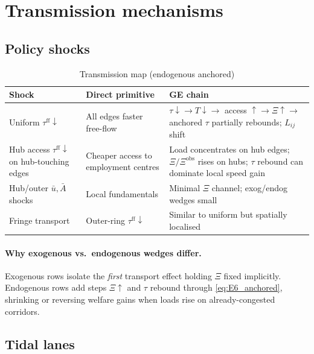 \documentclass[12pt]{article}
\newcommand{\ubar}{\bar u}
\newcommand{\Abar}{\bar A}
\newcommand{\obs}{\mathrm{obs}}
\newcommand{\ff}{\mathrm{ff}}
\begin{document}
\section{Transmission mechanisms}\label{sec:transmission}

\subsection{Policy shocks}

\begin{table}[htbp]
  \centering
  \caption{Transmission map (endogenous anchored)}
  \small
  \begin{tabular}{p{3.2cm}p{4.2cm}p{5.5cm}}
  \toprule
  Shock & Direct primitive & GE chain \\
  \midrule
  Uniform $\tau^{\ff}\downarrow$ &
    All edges faster free-flow &
    $\tau\downarrow\to T\downarrow\to$ access $\uparrow\to\Xi\uparrow\to$
    anchored $\tau$ partially rebounds; $L_{ij}$ shift \\
  Hub access $\tau^{\ff}\downarrow$ on hub-touching edges &
    Cheaper access to employment centres &
    Load concentrates on hub edges; $\Xi/\Xi^{\obs}$ rises on hubs;
    $\tau$ rebound can dominate local speed gain \\
  Hub/outer $\ubar,\Abar$ shocks &
    Local fundamentals &
    Minimal $\Xi$ channel; exog/endog wedges small \\
  Fringe transport &
    Outer-ring $\tau^{\ff}\downarrow$ &
    Similar to uniform but spatially localised \\
  \bottomrule
  \end{tabular}
\end{table}

\paragraph{Why exogenous vs.\ endogenous wedges differ.}
Exogenous rows isolate the \emph{first} transport effect holding $\Xi$ fixed
implicitly.
Endogenous rows add steps $\Xi\uparrow$ and $\tau$ rebound through
\eqref{eq:E6_anchored}, shrinking or reversing welfare gains when loads rise
on already-congested corridors.

\subsection{Tidal lanes}
\end{document}
